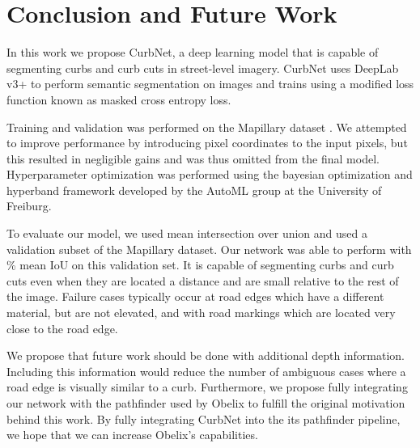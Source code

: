 \chapter{Conclusion and Future Work}\label{chap:conclusion}
In this work we propose CurbNet, a deep learning model that is capable of segmenting curbs and curb cuts in street-level imagery.
CurbNet uses DeepLab v3+ to perform semantic segmentation on images and trains using a modified loss function known as masked cross entropy loss.

Training and validation was performed on the Mapillary dataset \cite{mapillary}.
We attempted to improve performance by introducing pixel coordinates to the input pixels, but this resulted in negligible gains and was thus omitted from the final model.
Hyperparameter optimization was performed using the bayesian optimization and hyperband framework developed by the AutoML group at the University of Freiburg.

To evaluate our model, we used mean intersection over union and used a validation subset of the Mapillary dataset.
Our network was able to perform with \% mean IoU on this validation set.
It is capable of segmenting curbs and curb cuts even when they are located a distance and are small relative to the rest of the image.
Failure cases typically occur at road edges which have a different material, but are not elevated, and with road markings which are located very close to the road edge.

We propose that future work should be done with additional depth information.
Including this information would reduce the number of ambiguous cases where a road edge is visually similar to a curb.
Furthermore, we propose fully integrating our network with the pathfinder used by Obelix to fulfill the original motivation behind this work.
By fully integrating CurbNet into the its pathfinder pipeline, we hope that we can increase Obelix's capabilities.
